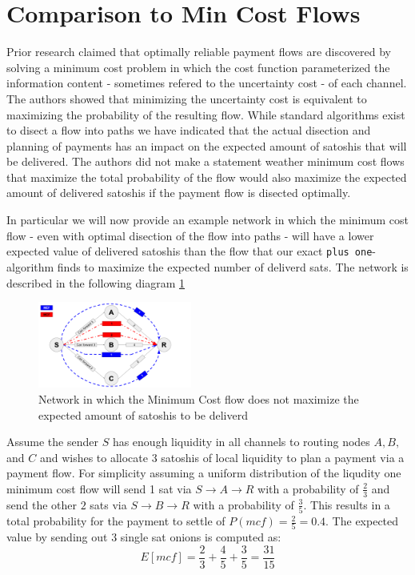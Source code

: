 \documentclass[10pt,twocolumn]{article}
\begin{document}
\section{Comparison to Min Cost Flows}
Prior research \cite{pickhardt2021optimally} claimed that optimally reliable payment flows are discovered by solving a minimum cost problem in which the cost function parameterized the information content - sometimes refered to the uncertainty cost - of each channel.
The authors showed that minimizing the uncertainty cost is equivalent to maximizing the probability of the resulting flow.
While standard algorithms exist to disect a flow into paths we have indicated that the actual disection and planning of payments has an impact on the expected amount of satoshis that will be delivered.
The authors did not make a statement weather minimum cost flows that maximize the total probability of the flow would also maximize the expected amount of delivered satoshis if the payment flow is disected optimally.

In particular we will now provide an example network in which the minimum cost flow - even with optimal disection of the flow into paths - will have a lower expected value of delivered satoshis than the flow that our exact \texttt{plus one}-algorithm finds to maximize the expected number of deliverd sats.
The network is described in the following diagram \ref{fig:counterExample}

\begin{figure}[htpb]
  \center
  \includegraphics[width=0.45\textwidth]{img/counterExample}
  \caption{Network in which the Minimum Cost flow does not maximize the expected amount of satoshis to be deliverd}
  \label{fig:counterExample}
\end{figure}

Assume the sender $S$ has enough liquidity in all channels to routing nodes $A,B,$ and $C$ and wishes to allocate $3$ satoshis of local liquidity to plan a payment via a payment flow.
For simplicity assuming a uniform distribution of the liqudity one minimum cost flow will send 1 sat via $S \rightarrow A \rightarrow R$ with a probability of $\frac{2}{3}$ and send the other $2$ sats via $S \rightarrow B \rightarrow R$ with a probability of $\frac{3}{5}$. This results in a total probability for the payment to settle of $P(mcf)=\frac{2}{5} = 0.4$.
The expected value by sending out $3$ single sat onions is computed as:
\[
E[mcf] = \frac{2}{3} + \frac{4}{5} + \frac{3}{5} = \frac{31}{15}
\]
\end{document}
